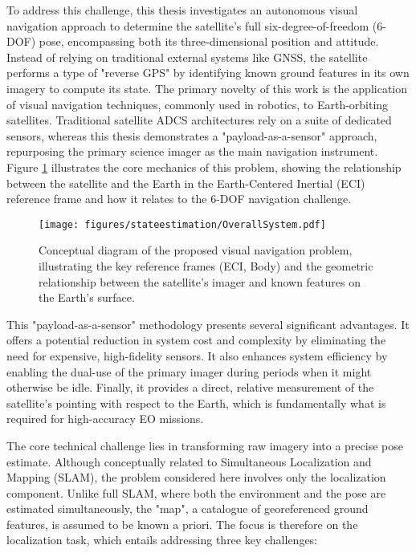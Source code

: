 \label{sec:solution}

\noindent
To address this challenge, this thesis investigates an autonomous visual navigation approach to determine the satellite's full six-degree-of-freedom (6-DOF) pose, 
encompassing both its three-dimensional position and attitude. Instead of relying on traditional external systems like GNSS, the satellite performs a type of "reverse GPS" by 
identifying known ground features in its own imagery to compute its state. The primary novelty of this work is the application of visual navigation techniques, 
commonly used in robotics, to Earth-orbiting satellites. Traditional satellite ADCS architectures rely on a suite of dedicated sensors, whereas this 
thesis demonstrates a "payload-as-a-sensor" approach, repurposing the primary science imager as the main navigation instrument. Figure \ref{fig:satellite_concept} 
illustrates the core mechanics of this problem, showing the relationship between the satellite and the Earth in the Earth-Centered Inertial (ECI) reference frame and 
how it relates to the 6-DOF navigation challenge.

\begin{figure}[H]
    \centering
    \texttt{[image: figures/stateestimation/OverallSystem.pdf]}
    \caption{Conceptual diagram of the proposed visual navigation problem, illustrating the key reference frames (ECI, Body) and the geometric relationship between the 
    satellite's imager and known features on the Earth's surface.}
    \label{fig:satellite_concept}
\end{figure}

\noindent
This "payload-as-a-sensor" methodology presents several significant advantages. It offers a potential reduction in system cost and complexity by eliminating the need for 
expensive, high-fidelity sensors. It also enhances system efficiency by enabling the dual-use of the primary imager during periods when it might otherwise be idle. 
Finally, it provides a direct, relative measurement of the satellite's pointing with respect to the Earth, which is fundamentally what is required for high-accuracy EO missions.
\vspace{0.5cm}

\noindent
The core technical challenge lies in transforming raw imagery into a precise pose estimate. Although conceptually related to Simultaneous Localization and Mapping (SLAM), the problem considered here involves only the localization component. Unlike full SLAM, where both the environment and the pose are estimated simultaneously, the "map", a catalogue of georeferenced ground features, is assumed to be known a priori. The focus is therefore on the localization task, which entails addressing three key challenges:

